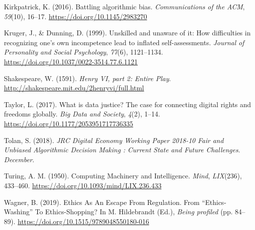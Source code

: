 \documentclass[
]{book}
\newlength{\cslhangindent}
\newenvironment{cslreferences}%
  {\setlength{\parindent}{0pt}%
  \everypar{\setlength{\hangindent}{\cslhangindent}}\ignorespaces}%
  {\par}
\begin{document}
\begin{cslreferences}
\leavevmode\hypertarget{ref-Kirkpatrick2016}{}%
Kirkpatrick, K. (2016). Battling algorithmic bias. \emph{Communications of the ACM}, \emph{59}(10), 16--17. \url{https://doi.org/10.1145/2983270}

\leavevmode\hypertarget{ref-Kruger1999}{}%
Kruger, J., \& Dunning, D. (1999). Unskilled and unaware of it: How difficulties in recognizing one's own incompetence lead to inflated self-assessments. \emph{Journal of Personality and Social Psychology}, \emph{77}(6), 1121--1134. \url{https://doi.org/10.1037/0022-3514.77.6.1121}

\leavevmode\hypertarget{ref-Shakespeare}{}%
Shakespeare, W. (1591). \emph{Henry VI, part 2: Entire Play}. \url{http://shakespeare.mit.edu/2henryvi/full.html}

\leavevmode\hypertarget{ref-Taylor2017}{}%
Taylor, L. (2017). What is data justice? The case for connecting digital rights and freedoms globally. \emph{Big Data and Society}, \emph{4}(2), 1--14. \url{https://doi.org/10.1177/2053951717736335}

\leavevmode\hypertarget{ref-Tolan2018}{}%
Tolan, S. (2018). \emph{JRC Digital Economy Working Paper 2018-10 Fair and Unbiased Algorithmic Decision Making : Current State and Future Challenges}. \emph{December}.

\leavevmode\hypertarget{ref-TURING1950}{}%
Turing, A. M. (1950). Computing Machinery and Intelligence. \emph{Mind}, \emph{LIX}(236), 433--460. \url{https://doi.org/10.1093/mind/LIX.236.433}

\leavevmode\hypertarget{ref-Hildebrandt2019}{}%
Wagner, B. (2019). Ethics As An Escape From Regulation. From ``Ethics-Washing'' To Ethics-Shopping? In M. Hildebrandt (Ed.), \emph{Being profiled} (pp. 84--89). \url{https://doi.org/10.1515/9789048550180-016}
\end{cslreferences}
\end{document}
